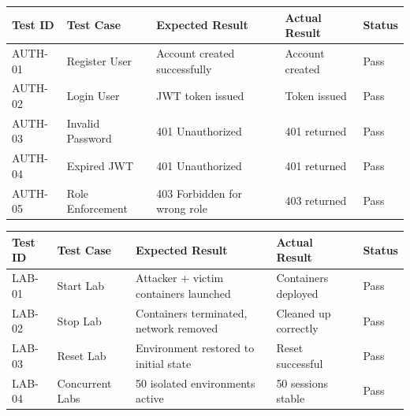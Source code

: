 \documentclass[12pt,a4paper]{report}
\newcommand{\hrow}{}
\newcommand{\hcell}[1]{\textbf{#1}}
\newcommand{\altrow}{}
\begin{document}
\vspace{8pt}

\begin{center}
\begin{tabular}{|L{1.8cm}|L{3cm}|L{3.2cm}|L{3.2cm}|L{2cm}|}
\hline
\hrow \hcell{Test ID} & \hcell{Test Case} & \hcell{Expected Result} & \hcell{Actual Result} & \hcell{Status} \\
\hline
AUTH-01 & Register User & Account created successfully & Account created & Pass \\\hline
\altrow AUTH-02 & Login User & JWT token issued & Token issued & Pass \\\hline
AUTH-03 & Invalid Password & 401 Unauthorized & 401 returned & Pass \\\hline
\altrow AUTH-04 & Expired JWT & 401 Unauthorized & 401 returned & Pass \\\hline
AUTH-05 & Role Enforcement & 403 Forbidden for wrong role & 403 returned & Pass \\\hline
\end{tabular}
\label{tab:auth-test}
\end{center}

\vspace{8pt}

\begin{center}
\begin{tabular}{|L{1.8cm}|L{3cm}|L{3.2cm}|L{3.2cm}|L{2cm}|}
\hline
\hrow \hcell{Test ID} & \hcell{Test Case} & \hcell{Expected Result} & \hcell{Actual Result} & \hcell{Status} \\
\hline
LAB-01 & Start Lab & Attacker + victim containers launched & Containers deployed & Pass \\\hline
\altrow LAB-02 & Stop Lab & Containers terminated, network removed & Cleaned up correctly & Pass \\\hline
LAB-03 & Reset Lab & Environment restored to initial state & Reset successful & Pass \\\hline
\altrow LAB-04 & Concurrent Labs & 50 isolated environments active & 50 sessions stable & Pass \\\hline
\end{tabular}
\label{tab:lab-test}
\end{center}

\vspace{8pt}
\end{document}

